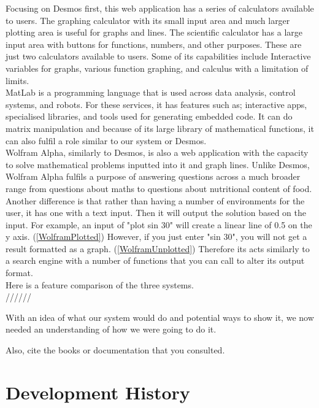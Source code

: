 \documentclass[a4paper, oneside, 11pt]{report}
\begin{document}
Focusing on Desmos first, this web application has a series of calculators available to users. The graphing calculator with its small input area and much larger plotting area is useful for graphs and lines. The scientific calculator has a large input area with buttons for functions, numbers, and other purposes. These are just two calculators available to users. Some of its capabilities include Interactive variables for graphs, various function graphing, and calculus with a limitation of limits. \\

MatLab is a programming language that is used across data analysis, control systems, and robots. For these services, it has features such as; interactive apps, specialised libraries, and tools used for generating embedded code. It can do matrix manipulation \citep{Matlab-Feat:2025} and because of its large library of mathematical functions, it can also fulfil a role similar to our system or Desmos. \\

Wolfram Alpha, similarly to Desmos, is also a web application with the capacity to solve mathematical problems inputted into it and graph lines. Unlike Desmos, Wolfram Alpha fulfils a purpose of answering questions across a much broader range from questions about maths to questions about nutritional content of food. Another difference is that rather than having a number of environments for the user, it has one with a text input. Then it will output the solution based on the input. For example, an input of "plot sin 30" will create a linear line of 0.5 on the y axis. (\ref{WolframPlotted})
However, if you just enter "sin 30", you will not get a result formatted as a graph. (\ref{WolframUnplotted})
Therefore its acts similarly to a search engine with a number of functions that you can call to alter its output format. \\

Here is a feature comparison of the three systems. \\//////

With an idea of what our system would do and potential ways to show it, we now needed an understanding of how we were going to do it. 


Also, cite the books \citep{Nystrom:2021} or documentation \citep{WPF:2023} that you consulted.
\chapter{Development History}\label{Chap:DevHist}
\end{document}
